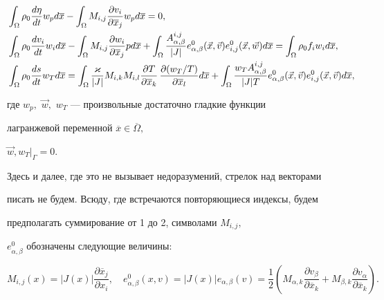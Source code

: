 \begin{align} 


&\int_\Omega\rho_0\frac{d\eta}{dt}w_p d\overline x- 


  \int_\Omega M_{i,j}\frac{\partial v_i}{\partial\overline x_j} 


  w_p d\overline x=0,\notag \\ 


&\int_\Omega\rho_0\frac{dv_i}{dt}w_i d\overline x- 


  \int_\Omega M_{i,j}\frac{\partial w_i}{\partial\overline x_j}


  p d\overline x +\int_\Omega\frac{A^{i,j}_{\alpha,\beta}}{|J|} 


  e^0_{\alpha,\beta}(\Vec x,\Vec v)e^0_{i,j}(\Vec x,\Vec w) 


  d \overline x = \int_\Omega \rho_0 f_i w_i d\overline x,\\


&\int_\Omega\rho_0\frac{ds}{dt}w_T d\overline x =


  \int_\Omega \frac{\varkappa}{|J|}M_{i,k}M_{i,l} 


  \frac{\partial T}{\partial \overline x_k}\, 


  \frac{\partial(w_T/T)}{\partial\overline x_l}d\overline x+ 


  \int_\Omega \frac{w_TA^{i,j}_{\alpha,\beta}}{|J|T}


  e^0_{\alpha,\beta}(\Vec x,\Vec v)e^0_{i,j} 


  (\Vec x,\Vec v)d\overline x,\notag


\end{align} 


где $w_p,$ $\Vec w,$ $w_T$ --- произвольные достаточно гладкие функции 


лагранжевой переменной $\overline x \in \overline\Omega,$ 


$\Vec w,w_T|_\Gamma = 0.$ 


Здесь и далее, где это не вызывает недоразумений, стрелок над векторами 


писать не будем. Всюду, где встречаются повторяющиеся индексы, будем 


предполагать суммирование от 1 до 2, символами $M_{i,j},$ 


$e^0_{\alpha,\beta}$ обозначены следующие величины: 


\begin{equation} 


M_{i,j}(x)=|J(x)|\frac{\partial\overline x_j}{\partial x_i},\quad 


e^0_{\alpha,\beta}(x,v)=|J(x)|e_{\alpha,\beta}(v)= 


\frac12\left(M_{\alpha,k}\frac{\partial v_\beta}{\partial\overline x_k} 


+M_{\beta,k}\frac{\partial v_\alpha}{\partial\overline x_k}\right). 


\end{equation} 


